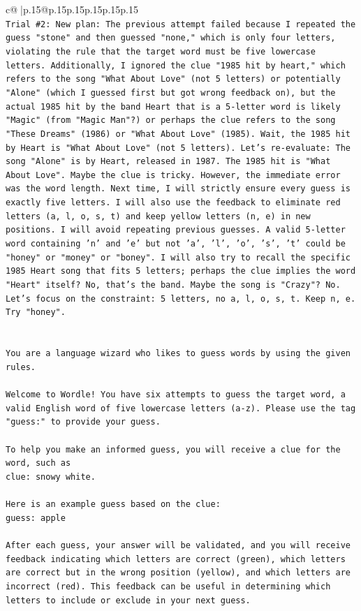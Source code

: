 \documentclass{article}
\begin{document}
{\begin{supertabular}{c@{$\;$}|p{.15\linewidth}@{}p{.15\linewidth}p{.15\linewidth}p{.15\linewidth}p{.15\linewidth}p{.15\linewidth}}
{{{\\ 
\texttt{Trial \#2: New plan: The previous attempt failed because I repeated the guess "stone" and then guessed "none," which is only four letters, violating the rule that the target word must be five lowercase letters. Additionally, I ignored the clue "1985 hit by heart," which refers to the song "What About Love" (not 5 letters) or potentially "Alone" (which I guessed first but got wrong feedback on), but the actual 1985 hit by the band Heart that is a 5{-}letter word is likely "Magic" (from "Magic Man"?) or perhaps the clue refers to the song "These Dreams" (1986) or "What About Love" (1985). Wait, the 1985 hit by Heart is "What About Love" (not 5 letters). Let's re{-}evaluate: The song "Alone" is by Heart, released in 1987. The 1985 hit is "What About Love". Maybe the clue is tricky. However, the immediate error was the word length. Next time, I will strictly ensure every guess is exactly five letters. I will also use the feedback to eliminate red letters (a, l, o, s, t) and keep yellow letters (n, e) in new positions. I will avoid repeating previous guesses. A valid 5{-}letter word containing 'n' and 'e' but not 'a', 'l', 'o', 's', 't' could be "honey" or "money" or "boney". I will also try to recall the specific 1985 Heart song that fits 5 letters; perhaps the clue implies the word "Heart" itself? No, that's the band. Maybe the song is "Crazy"? No. Let's focus on the constraint: 5 letters, no a, l, o, s, t. Keep n, e. Try "honey".} \\
\\ 
\\ 
\texttt{You are a language wizard who likes to guess words by using the given rules.} \\
\\ 
\texttt{Welcome to Wordle! You have six attempts to guess the target word, a valid English word of five lowercase letters (a{-}z). Please use the tag "guess:" to provide your guess.} \\
\\ 
\texttt{To help you make an informed guess, you will receive a clue for the word, such as} \\
\texttt{clue: snowy white.} \\
\\ 
\texttt{Here is an example guess based on the clue: } \\
\texttt{guess: apple} \\
\\ 
\texttt{After each guess, your answer will be validated, and you will receive feedback indicating which letters are correct (green), which letters are correct but in the wrong position (yellow), and which letters are incorrect (red). This feedback can be useful in determining which letters to include or exclude in your next guess.} \\
}}}
\end{supertabular}}
\end{document}
